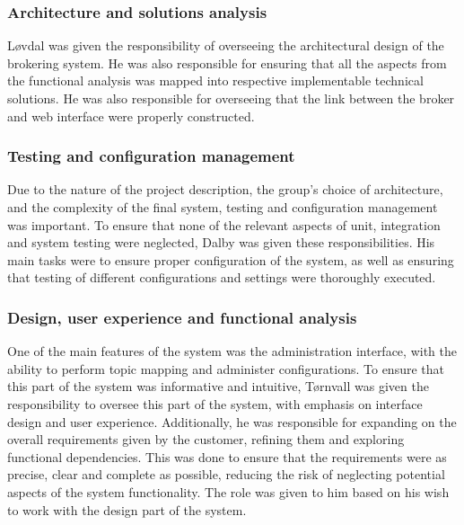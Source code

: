 \subsubsection{Architecture and solutions analysis}
\label{subsec:process_and_methodology-project_organization-architecture_and_solutions_analysis}

Løvdal was given the responsibility of overseeing the architectural design of the brokering system. He was also responsible for ensuring that all the aspects from the functional analysis was mapped into respective implementable technical solutions. He was also responsible for overseeing that the link between the broker and web interface were properly constructed.

\subsubsection{Testing and configuration management}
\label{subsec:process_and_methodology-project_organization-testing_and_configuration_management}

Due to the nature of the project description, the group's choice of architecture, and the complexity of the final system, testing and configuration management was important. To ensure that none of the relevant aspects of unit, integration and system testing were neglected, Dalby was given these responsibilities. His main tasks were to ensure proper configuration of the system, as well as ensuring that testing of different configurations and settings were thoroughly executed.

\subsubsection{Design, user experience and functional analysis}
\label{subsec:process_and_methodology-project_organization-design_user_experience_and_functional_analysis}

One of the main features of the system was the administration interface, with the ability to perform topic mapping and administer configurations. To ensure that this part of the system was informative and intuitive, Tørnvall was given the responsibility to oversee this part of the system, with emphasis on interface design and user experience. Additionally, he was responsible for expanding on the overall requirements given by the customer, refining them and exploring functional dependencies. This was done to ensure that the requirements were as precise, clear and complete as possible, reducing the risk of neglecting potential aspects of the system functionality. The role was given to him based on his wish to work with the design part of the system.

